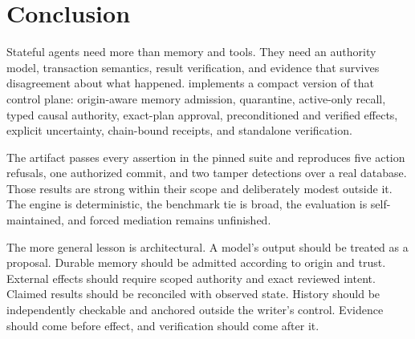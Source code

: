 \section{Conclusion}

Stateful agents need more than memory and tools. They need an authority model, transaction semantics, result verification, and evidence that survives disagreement about what happened. \system{} implements a compact version of that control plane: origin-aware memory admission, quarantine, active-only recall, typed causal authority, exact-plan approval, preconditioned and verified effects, explicit uncertainty, chain-bound receipts, and standalone verification.

The artifact passes every assertion in the pinned \benchmark{} suite and reproduces five action refusals, one authorized commit, and two tamper detections over a real database. Those results are strong within their scope and deliberately modest outside it. The engine is deterministic, the benchmark tie is broad, the evaluation is self-maintained, and forced mediation remains unfinished.

The more general lesson is architectural. A model's output should be treated as a proposal. Durable memory should be admitted according to origin and trust. External effects should require scoped authority and exact reviewed intent. Claimed results should be reconciled with observed state. History should be independently checkable and anchored outside the writer's control. Evidence should come before effect, and verification should come after it.
